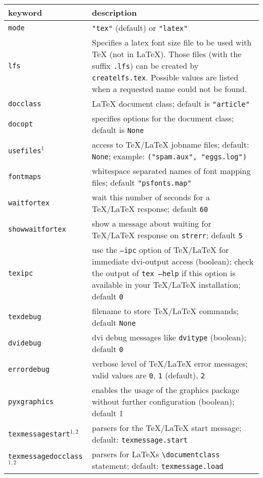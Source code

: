 \medskip
\begin{tabularx}{\linewidth}{l>{\raggedright\arraybackslash}X}
keyword&description\\
\hline
\texttt{mode}&\texttt{"tex"} (default) or \texttt{"latex"}\\
\texttt{lfs}&Specifies a latex font size file to be used with \TeX{} (not in \LaTeX). Those files (with the suffix \texttt{.lfs}) can be created by \texttt{createlfs.tex}. Possible values are listed when a requested name could not be found.\\
\texttt{docclass}&\LaTeX{} document class; default is \texttt{"article"}\\
\texttt{docopt}&specifies options for the document class; default is \texttt{None}\\
\texttt{usefiles}$^1$&access to \TeX/\LaTeX{} jobname files; default: \texttt{None}; example: \texttt{("spam.aux", "eggs.log")}\\
\texttt{fontmaps}&whitespace separated names of font mapping files; default \texttt{"psfonts.map"}\\
\texttt{waitfortex}&wait this number of seconds for a \TeX/\LaTeX{} response; default \texttt{60}\\
\texttt{showwaitfortex}&show a message about waiting for \TeX/\LaTeX{} response on \texttt{strerr}; default \texttt{5}\\
\texttt{texipc}&use the \texttt{--ipc} option of \TeX/\LaTeX{} for immediate dvi-output access (boolean); check the output of \texttt{tex --help} if this option is available in your \TeX/\LaTeX{} installation; default \texttt{0}\\
\texttt{texdebug}&filename to store \TeX/\LaTeX{} commands; default \texttt{None}\\
\texttt{dvidebug}&dvi debug messages like \texttt{dvitype} (boolean); default \texttt{0}\\
\texttt{errordebug}&verbose level of \TeX/\LaTeX{} error messages; valid values are \texttt{0}, \texttt{1} (default), \texttt{2}\\
\texttt{pyxgraphics}&enables the usage of the graphics package without further configuration (boolean); default 1\\
\texttt{texmessagestart}$^{1,2}$&parsers for the \TeX/\LaTeX{} start message; default: \texttt{texmessage.start}\\
\texttt{texmessagedocclass}$^{1,2}$&parsers for \LaTeX{}s \texttt{\textbackslash{}documentclass} statement; default: \texttt{texmessage.load}\\

\end{tabularx}
